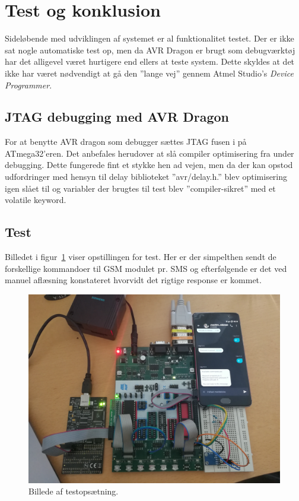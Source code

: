 \section{Test og konklusion}

Sideløbende med udviklingen af systemet er al funktionalitet testet. Der er ikke sat nogle automatiske test op, men da AVR Dragon er brugt som debugværktøj har det alligevel 
været hurtigere end ellers at teste system. Dette skyldes at det ikke har været nødvendigt at gå den ''lange vej'' gennem Atmel Studio's \textit{Device Programmer}.

\subsection{JTAG debugging med AVR Dragon}

For at benytte AVR dragon som debugger sættes JTAG fusen i på ATmega32'eren. Det anbefales herudover at slå compiler optimisering fra under debugging. 
Dette fungerede fint et stykke hen ad vejen, men da der kan opstod udfordringer med hensyn til delay biblioteket ''avr/delay.h.'' blev optimisering igen slået til og variabler der brugtes
til test blev ''compiler-sikret'' med et volatile keyword. 

\subsection{Test}

Billedet i figur~\ref{fig:testsetup} viser opstillingen for test. Her er der simpelthen sendt de forskellige kommandoer til GSM modulet pr. SMS og efterfølgende er det ved manuel aflæsning konstateret hvorvidt det rigtige response er kommet.

\begin{figure}[h]
	\centering
	\includegraphics[width=\linewidth]{figs/test_setup}
	\caption{Billede af testopsætning.}
	\label{fig:testsetup}
\end{figure}

